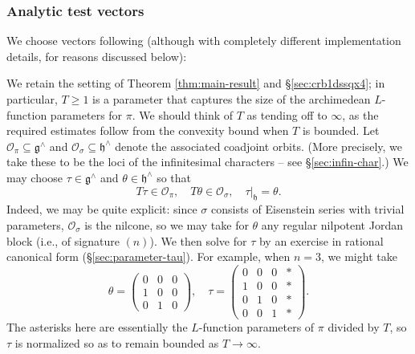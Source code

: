 \subsubsection{Analytic test vectors}\label{sec:analyt-test-vect}
We choose vectors following \cite{nelson-venkatesh-1} (although with completely different implementation details, for reasons discussed below):

We retain the setting of Theorem \ref{thm:main-result} and \S\ref{sec:crb1dssqx4}; in particular, $T \geq 1$ is a parameter that captures the size of the archimedean $L$-function parameters for $\pi$.  We should think of $T$ as tending off to $\infty$, as the required estimates follow from the convexity bound when $T$ is bounded.  Let $\mathcal{O}_\pi \subseteq \mathfrak{g}^\wedge$ and $\mathcal{O}_\sigma \subseteq \mathfrak{h}^\wedge$ denote the associated coadjoint orbits.  (More precisely, we take these to be the loci of the infinitesimal characters -- see \S\ref{sec:infin-char}.)  We may choose $\tau \in \mathfrak{g}^\wedge$ and $\theta \in \mathfrak{h}^\wedge$ so that
\begin{equation*}
  T \tau \in \mathcal{O}_\pi, \quad
  T \theta \in \mathcal{O}_{\sigma},
  \quad
  \tau|_{\mathfrak{h}} = \theta.
\end{equation*}
Indeed, we may be quite explicit: since $\sigma$ consists of Eisenstein series with trivial parameters, $\mathcal{O}_\sigma$ is the nilcone, so we may take for $\theta$ any regular nilpotent Jordan block (i.e., of signature $(n)$).  We then solve for $\tau$ by an exercise in rational canonical form (\S\ref{sec:parameter-tau}).  For example, when $n = 3$, we might take
\begin{equation*}
  \theta = \begin{pmatrix}
    0 & 0 & 0 \\
    1 & 0 & 0 \\
    0 & 1 & 0
  \end{pmatrix},
  \quad
  \tau = \begin{pmatrix}
    0 & 0 & 0 & \ast \\
    1 & 0 & 0 & \ast \\
    0 & 1 & 0 & \ast \\
    0 & 0 & 1 & \ast
  \end{pmatrix}.
\end{equation*}
The asterisks here are essentially the $L$-function parameters of $\pi$ divided by $T$, so $\tau$ is normalized so as to remain bounded as $T \rightarrow \infty$.


